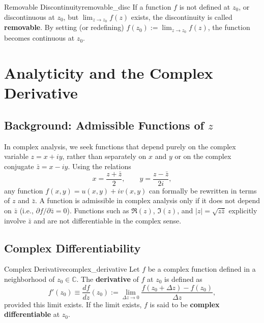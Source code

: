 \begin{definition}{Removable Discontinuity}{removable_disc}
If a function $f$ is not defined at $z_0$, or discontinuous at $z_0$, but $\lim_{z \to z_0} f(z)$ exists, the discontinuity is called \textbf{removable}. By setting (or redefining) $f(z_0) := \lim_{z \to z_0} f(z)$, the function becomes continuous at $z_0$.
\end{definition}


\section{Analyticity and the Complex Derivative}

\subsection{Background: Admissible Functions of \texorpdfstring{$z$}{z}}

In complex analysis, we seek functions that depend purely on the complex variable $z = x + iy$, rather than separately on $x$ and $y$ or on the complex conjugate $\bar{z} = x - iy$.
Using the relations
\begin{equation}
x = \frac{z + \bar{z}}{2}, \qquad y = \frac{z - \bar{z}}{2i},
\end{equation}
any function $f(x, y) = u(x, y) + iv(x, y)$ can formally be rewritten in terms of $z$ and $\bar{z}$. A function is admissible in complex analysis only if it does not depend on $\bar{z}$ (i.e., $\partial f / \partial \bar{z} = 0$). Functions such as $\Re(z)$, $\Im(z)$, and $|z| = \sqrt{z\bar{z}}$ explicitly involve $\bar{z}$ and are not differentiable in the complex sense.

\subsection{Complex Differentiability}

\begin{definition}{Complex Derivative}{complex_derivative}
Let $f$ be a complex function defined in a neighborhood of $z_0 \in \mathbb{C}$. The \textbf{derivative} of $f$ at $z_0$ is defined as
\begin{equation}
f'(z_0) \equiv \frac{df}{dz}(z_0) := \lim_{\Delta z \to 0} \frac{f(z_0 + \Delta z) - f(z_0)}{\Delta z},
\end{equation}
provided this limit exists. If the limit exists, $f$ is said to be \textbf{complex differentiable} at $z_0$.
\end{definition}


